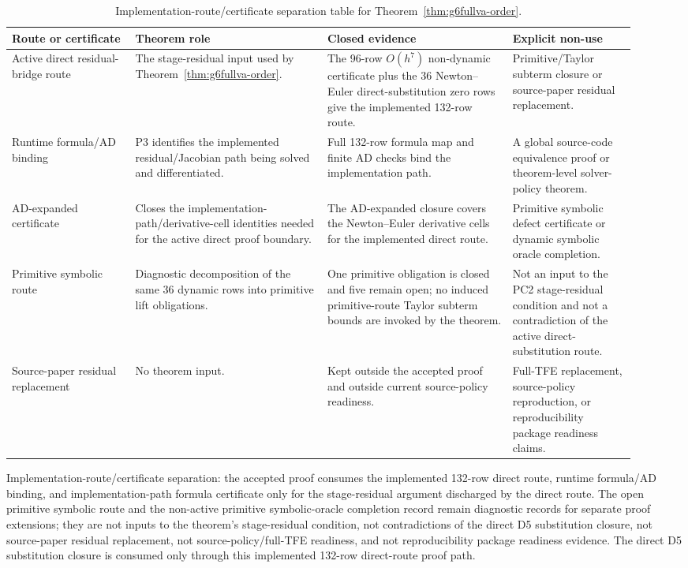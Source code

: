 \documentclass[preprint,12pt]{elsarticle}
\newcommand{\tfe}{TFE}
\begin{document}
\begin{table}[htbp]
\centering
\caption{Implementation-route/certificate separation table for
Theorem~\ref{thm:g6fullva-order}.}
\label{tab:implementation-route-oracle-separation-ledger}
\scriptsize
\setlength{\tabcolsep}{2pt}
\renewcommand{\arraystretch}{0.9}
\begin{tabular}{P{0.18\linewidth}P{0.29\linewidth}P{0.27\linewidth}P{0.18\linewidth}}
\toprule
Route or certificate & Theorem role & Closed evidence & Explicit non-use \\
\midrule
Active direct residual-bridge route &
The stage-residual input used by Theorem~\ref{thm:g6fullva-order}. &
The 96-row \(O(h^7)\) non-dynamic certificate plus the 36
Newton--Euler direct-substitution zero rows give the implemented 132-row
route. &
Primitive/Taylor subterm closure or source-paper residual replacement. \\
Runtime formula/AD binding &
P3 identifies the implemented residual/Jacobian path being solved and
differentiated. &
Full 132-row formula map and finite AD checks bind the implementation path. &
A global source-code equivalence proof or theorem-level solver-policy
theorem. \\
AD-expanded certificate &
Closes the implementation-path/derivative-cell identities needed for the active
direct proof boundary. &
The AD-expanded closure covers the Newton--Euler derivative cells for the
implemented direct route. &
Primitive symbolic defect certificate or dynamic symbolic oracle completion. \\
Primitive symbolic route &
Diagnostic decomposition of the same 36 dynamic rows into primitive lift
obligations. &
One primitive obligation is closed and five remain open; no induced
primitive-route Taylor subterm bounds are invoked by the theorem. &
Not an input to the PC2 stage-residual condition and not a contradiction of the
active direct-substitution route. \\
Source-paper residual replacement &
No theorem input. &
Kept outside the accepted proof and outside current source-policy readiness. &
Full-\tfe{} replacement, source-policy reproduction, or reproducibility package readiness claims. \\
\bottomrule
\end{tabular}
\end{table}

Implementation-route/certificate separation: the
accepted proof consumes the implemented 132-row direct route, runtime formula/AD
binding, and implementation-path formula certificate only for the
stage-residual argument discharged by the direct route. The open primitive
symbolic route and the non-active primitive symbolic-oracle completion record
remain diagnostic records for separate proof extensions; they are
not inputs to the theorem's stage-residual condition, not contradictions of the direct D5 substitution closure,
not source-paper residual replacement, not source-policy/full-\tfe{}
readiness, and not reproducibility package readiness evidence.
The direct D5 substitution closure is consumed only through this implemented
132-row direct-route proof path.
\end{document}
